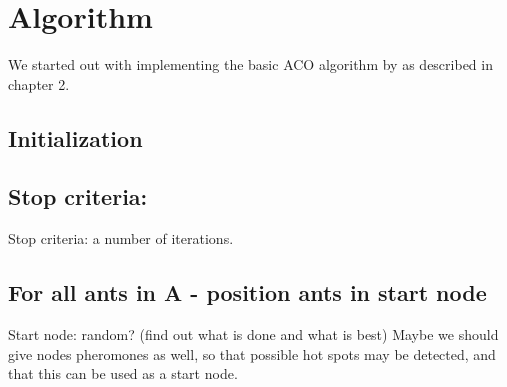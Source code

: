 \section{Algorithm}

We started out with implementing the basic ACO algorithm by \citet{nanda11} as described in chapter 2.

\subsection{Initialization}

\subsection{Stop criteria:}

Stop criteria: a number of iterations. 

\subsection{For all ants in A - position ants in start node}
Start node: random? (find out what is done and what is best) Maybe we should give nodes pheromones as well, so that possible hot spots may be detected, and that this can be used as a start node. 


